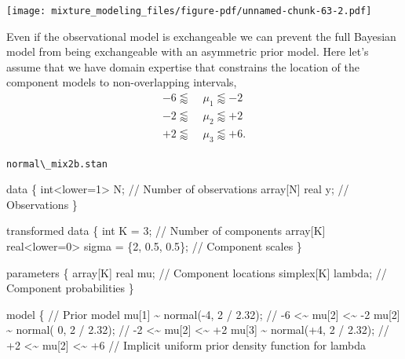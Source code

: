 \documentclass[
  letterpaper,
  DIV=11,
  numbers=noendperiod]{scrartcl}
\newenvironment{Shaded}{\begin{snugshade}}{\end{snugshade}}
\newcommand{\CommentTok}[1]{\textcolor[rgb]{0.37,0.37,0.37}{#1}}
\newcommand{\DataTypeTok}[1]{\textcolor[rgb]{0.68,0.00,0.00}{#1}}
\newcommand{\DecValTok}[1]{\textcolor[rgb]{0.68,0.00,0.00}{#1}}
\newcommand{\FloatTok}[1]{\textcolor[rgb]{0.68,0.00,0.00}{#1}}
\newcommand{\KeywordTok}[1]{\textcolor[rgb]{0.00,0.23,0.31}{#1}}
\newcommand{\NormalTok}[1]{\textcolor[rgb]{0.00,0.23,0.31}{#1}}
\begin{document}
\texttt{[image: mixture\_modeling\_files/figure-pdf/unnamed-chunk-63-2.pdf]}

Even if the observational model is exchangeable we can prevent the full
Bayesian model from being exchangeable with an asymmetric prior model.
Here let's assume that we have domain expertise that constrains the
location of the component models to non-overlapping intervals,
\begin{align*}
-6 \lessapprox & \; \mu_{1} \lessapprox -2
\\
-2 \lessapprox & \; \mu_{2} \lessapprox +2
\\
+2 \lessapprox & \; \mu_{3} \lessapprox +6.
\end{align*}

\begin{codelisting}

\caption{\texttt{normal\textbackslash\_mix2b.stan}}

\begin{Shaded}
\begin{Highlighting}[]
\KeywordTok{data}\NormalTok{ \{}
  \DataTypeTok{int}\NormalTok{\textless{}}\KeywordTok{lower}\NormalTok{=}\DecValTok{1}\NormalTok{\textgreater{} N;  }\CommentTok{// Number of observations}
  \DataTypeTok{array}\NormalTok{[N] }\DataTypeTok{real}\NormalTok{ y; }\CommentTok{// Observations}
\NormalTok{\}}

\KeywordTok{transformed data}\NormalTok{ \{}
  \DataTypeTok{int}\NormalTok{ K = }\DecValTok{3}\NormalTok{;                                    }\CommentTok{// Number of components}
  \DataTypeTok{array}\NormalTok{[K] }\DataTypeTok{real}\NormalTok{\textless{}}\KeywordTok{lower}\NormalTok{=}\DecValTok{0}\NormalTok{\textgreater{} sigma = \{}\DecValTok{2}\NormalTok{, }\FloatTok{0.5}\NormalTok{, }\FloatTok{0.5}\NormalTok{\}; }\CommentTok{// Component scales}
\NormalTok{\}}

\KeywordTok{parameters}\NormalTok{ \{}
  \DataTypeTok{array}\NormalTok{[K] }\DataTypeTok{real}\NormalTok{ mu;  }\CommentTok{// Component locations}
  \DataTypeTok{simplex}\NormalTok{[K] lambda; }\CommentTok{// Component probabilities}
\NormalTok{\}}

\KeywordTok{model}\NormalTok{ \{}
  \CommentTok{// Prior model}
\NormalTok{  mu[}\DecValTok{1}\NormalTok{] \textasciitilde{} normal({-}}\DecValTok{4}\NormalTok{, }\DecValTok{2}\NormalTok{ / }\FloatTok{2.32}\NormalTok{); }\CommentTok{// {-}6 \textless{}\textasciitilde{} mu[2] \textless{}\textasciitilde{} {-}2}
\NormalTok{  mu[}\DecValTok{2}\NormalTok{] \textasciitilde{} normal( }\DecValTok{0}\NormalTok{, }\DecValTok{2}\NormalTok{ / }\FloatTok{2.32}\NormalTok{); }\CommentTok{// {-}2 \textless{}\textasciitilde{} mu[2] \textless{}\textasciitilde{} +2}
\NormalTok{  mu[}\DecValTok{3}\NormalTok{] \textasciitilde{} normal(+}\DecValTok{4}\NormalTok{, }\DecValTok{2}\NormalTok{ / }\FloatTok{2.32}\NormalTok{); }\CommentTok{// +2 \textless{}\textasciitilde{} mu[2] \textless{}\textasciitilde{} +6}
  \CommentTok{// Implicit uniform prior density function for lambda}


\end{Highlighting}
\end{Shaded}
\end{codelisting}
\end{document}
